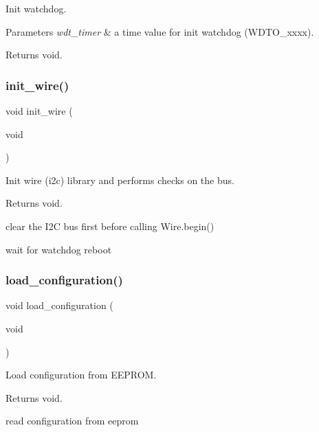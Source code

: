Init watchdog. 


\begin{DoxyParams}{Parameters}
{\em wdt\+\_\+timer} & a time value for init watchdog (W\+D\+T\+O\+\_\+xxxx). \\
\hline
\end{DoxyParams}
\begin{DoxyReturn}{Returns}
void. 
\end{DoxyReturn}
\mbox{\label{i2c-rain_8h_a7c21452937863fa02a29654247eef09b}} 
\subsubsection{\texorpdfstring{init\+\_\+wire()}{init\_wire()}}
{\footnotesize\ttfamily void init\+\_\+wire (\begin{DoxyParamCaption}\item[{void}]{ }\end{DoxyParamCaption})}



Init wire (i2c) library and performs checks on the bus. 

\begin{DoxyReturn}{Returns}
void. 
\end{DoxyReturn}
clear the I2C bus first before calling Wire.\+begin()

wait for watchdog reboot \mbox{\label{i2c-rain_8h_a1be652e7d942160a14a560e0be837358}} 
\subsubsection{\texorpdfstring{load\+\_\+configuration()}{load\_configuration()}}
{\footnotesize\ttfamily void load\+\_\+configuration (\begin{DoxyParamCaption}\item[{void}]{ }\end{DoxyParamCaption})}



Load configuration from E\+E\+P\+R\+OM. 

\begin{DoxyReturn}{Returns}
void. 
\end{DoxyReturn}
read configuration from eeprom \mbox{\label{i2c-rain_8h_ab08b9047f47849f399950705e769be2e}} 
